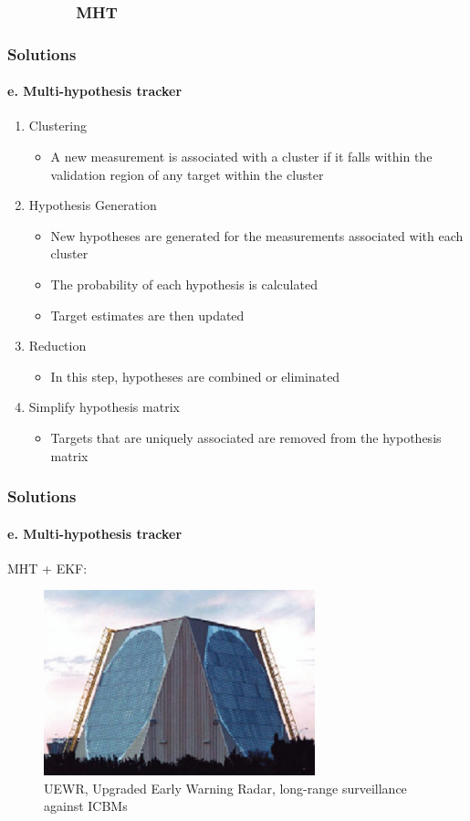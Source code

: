 \subsubsection{\ \ \ \ \ \ \ \ MHT }
\begin{frame}
\frametitle{Solutions}
\framesubtitle{e. Multi-hypothesis tracker}
\mypagenum
	\begin{enumerate}
	\item {\color{red}Clustering}
		\begin{itemize}
			\item A new measurement is associated with a cluster if it falls within the validation region of any target within the cluster
		\end{itemize}
	\item {\color{red}Hypothesis Generation}
		\begin{itemize} 
			\item New hypotheses are generated for the measurements associated with each cluster
			\item The probability of each hypothesis is calculated
			\item Target estimates are then updated
		\end{itemize}
	\item {\color{red}Reduction}
		\begin{itemize}
			\item In this step, hypotheses are combined or eliminated
		\end{itemize}
	\item {\color{red}Simplify hypothesis matrix}
		\begin{itemize}
			\item Targets that are uniquely associated are removed from the hypothesis matrix
		\end{itemize}
	\end{enumerate}
\end{frame}




\begin{frame}
\frametitle{Solutions}
\framesubtitle{e. Multi-hypothesis tracker}
\mypagenum
	MHT + EKF:
	\begin{figure}
		\includegraphics[width=0.7\textwidth]{figs/TRK_MHT_example_UEWR.jpg}
		\caption {UEWR, Upgraded Early Warning Radar, long-range surveillance against ICBMs}
	\end{figure}
\end{frame}



